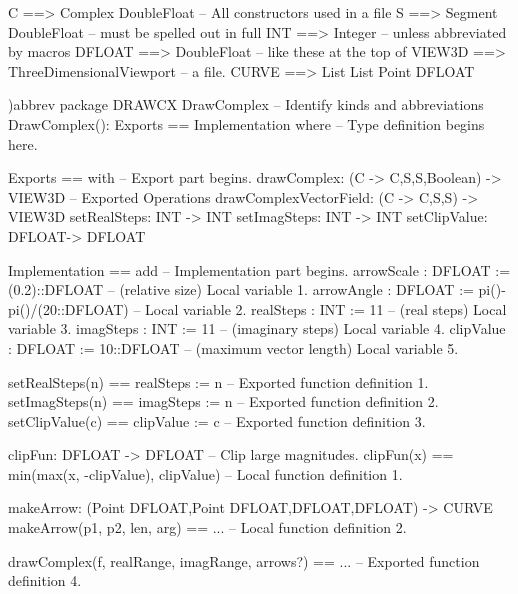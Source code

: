 \begin{figXmpLines}[caption={The DrawComplex package.},label={fig-pak-cdraw}]
C      ==> Complex DoubleFloat                       -- All constructors used in a file
S      ==> Segment DoubleFloat                       -- \quad{}must be spelled out in full
INT    ==> Integer                                   -- \quad{}unless abbreviated by macros
DFLOAT ==> DoubleFloat                               -- \quad{}like these at the top of
VIEW3D ==> ThreeDimensionalViewport                  -- \quad{}a file.
CURVE  ==> List List Point DFLOAT

)abbrev package DRAWCX DrawComplex                   -- Identify kinds and abbreviations
DrawComplex(): Exports == Implementation where       -- Type definition begins here.

  Exports == with                                    -- Export part begins.
    drawComplex: (C -> C,S,S,Boolean) -> VIEW3D      -- Exported Operations
    drawComplexVectorField: (C -> C,S,S) -> VIEW3D
    setRealSteps: INT -> INT
    setImagSteps: INT -> INT
    setClipValue: DFLOAT-> DFLOAT

  Implementation == add                              -- Implementation part begins.
    arrowScale : DFLOAT := (0.2)::DFLOAT             -- (relative size) Local variable 1.
    arrowAngle : DFLOAT := pi()-pi()/(20::DFLOAT)    -- Local variable 2.
    realSteps  : INT := 11                           -- (real steps) Local variable 3.
    imagSteps  : INT := 11                           -- (imaginary steps) Local variable 4.
    clipValue  : DFLOAT  := 10::DFLOAT               -- (maximum vector length) Local variable 5.

    setRealSteps(n) == realSteps := n                -- Exported function definition 1.
    setImagSteps(n) == imagSteps := n                -- Exported function definition 2.
    setClipValue(c) == clipValue := c                -- Exported function definition 3.

    clipFun: DFLOAT -> DFLOAT                        -- Clip large magnitudes.
    clipFun(x) == min(max(x, -clipValue), clipValue) -- Local function definition 1.

    makeArrow: (Point DFLOAT,Point DFLOAT,DFLOAT,DFLOAT) -> CURVE
    makeArrow(p1, p2, len, arg) == ...               -- Local function definition 2.

    drawComplex(f, realRange, imagRange, arrows?) == ... -- Exported function definition 4.
\end{figXmpLines}

